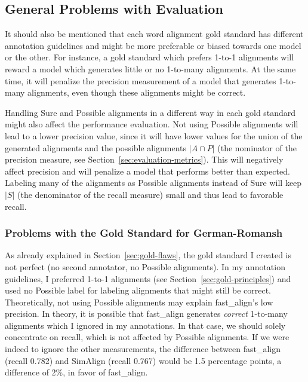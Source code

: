 \subsection{General Problems with Evaluation}
\label{sec:problems-evaluation}
It should also be mentioned that each word alignment gold standard has different annotation guidelines and might be more preferable or biased towards one model or the other. 
For instance, a gold standard which prefers 1-to-1 alignments will reward a model which generates little or no 1-to-many alignments. 
At the same time, it will penalize the precision measurement of a model that generates 1-to-many alignments, even though these alignments might be correct.

Handling Sure and Possible alignments in a different way in each gold standard might also affect the performance evaluation. 
Not using Possible alignments will lead to a lower precision value, since it will have lower values for the union of the generated alignments and the possible alignments $|A \cap P|$ (the nominator of the precision measure, see Section~\ref{sec:evaluation-metrics}). This will negatively affect precision and will penalize a model that performs better than expected. 
Labeling many of the alignments as Possible alignments instead of Sure will keep $|S|$ (the denominator of the recall measure) small and thus lead to favorable recall. 


\subsubsection{Problems with the Gold Standard for German-Romansh}
As already explained in Section~\ref{sec:gold-flaws}, the gold standard I created is not perfect (no second annotator, no Possible alignments). 
In my annotation guidelines, I preferred 1-to-1 alignments (see Section~\ref{sec:gold-principles}) and used no Possible label for labeling alignments that might still be correct.
Theoretically, not using Possible alignments may explain fast\_align's low precision. 
In theory, it is possible that fast\_align generates \emph{correct} 1-to-many alignments which I ignored in my annotations. 
In that case, we should solely concentrate on recall, which is not affected by Possible alignments. 
If we were indeed to ignore the other measurements, the difference between fast\_align (recall 0.782) and SimAlign (recall 0.767) would be 1.5 percentage points, a difference of 2\%, in favor of fast\_align.



